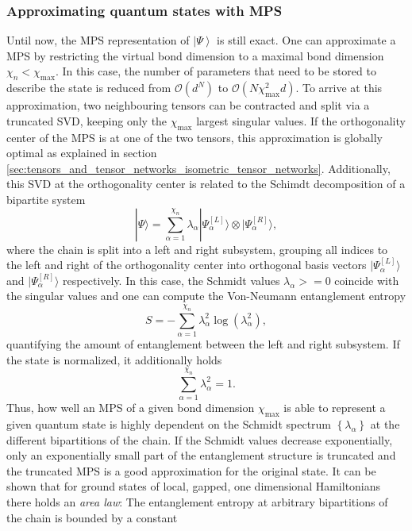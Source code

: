 \subsubsection*{Approximating quantum states with MPS}
Until now, the MPS representation of $\left|\Psi\right\rangle$ is still exact. One can approximate a MPS by restricting the virtual bond dimension to a maximal bond dimension $\chi_n < \chi_\text{max}$. In this case, the number of parameters that need to be stored to describe the state is reduced from $\mathcal{O}\left(d^N\right)$ to $\mathcal{O}\left(N\chi_\text{max}^2 d\right)$. To arrive at this approximation, two neighbouring tensors can be contracted and split via a truncated SVD, keeping only the $\chi_\text{max}$ largest singular values. If the orthogonality center of the MPS is at one of the two tensors, this approximation is globally optimal as explained in section \ref{sec:tensors_and_tensor_networks_isometric_tensor_networks}. Additionally, this SVD at the orthogonality center is related to the Schimdt decomposition of a bipartite system
\begin{equation}
	|\Psi\rangle = \sum_{\alpha=1}^{\chi_n} \lambda_\alpha | \Psi^{[L]}_\alpha\rangle \otimes |\Psi^{[R]}_\alpha\rangle,
\end{equation}
where the chain is split into a left and right subsystem, grouping all indices to the left and right of the orthogonality center into orthogonal basis vectors $|\Psi^{[L]}_\alpha\rangle$ and $|\Psi^{[R]}_\alpha\rangle$ respectively. In this case, the Schmidt values $\lambda_\alpha >= 0$ coincide with the singular values \cite{cite:DMRG_in_the_age_of_MPS} and one can compute the Von-Neumann entanglement entropy
\begin{equation}
	S = -\sum_{\alpha=1}^{\chi_n} \lambda_\alpha^2 \log\left(\lambda_\alpha^2\right),
\end{equation}
quantifying the amount of entanglement between the left and right subsystem. If the state is normalized, it additionally holds
\begin{equation}
	\sum_{\alpha=1}^{\chi_n} \lambda_\alpha^2 = 1.
\end{equation}
Thus, how well an MPS of a given bond dimension $\chi_\text{max}$ is able to represent a given quantum state is highly dependent on the Schmidt spectrum $\left\{\lambda_\alpha\right\}$ at the different bipartitions of the chain. If the Schmidt values decrease exponentially, only an exponentially small part of the entanglement structure is truncated and the truncated MPS is a good approximation for the original state. It can be shown \cite{cite:area_law_1D_proof, cite:area_laws_review} that for ground states of local, gapped, one dimensional Hamiltonians there holds an \textit{area law}: The entanglement entropy at arbitrary bipartitions of the chain is bounded by a constant
